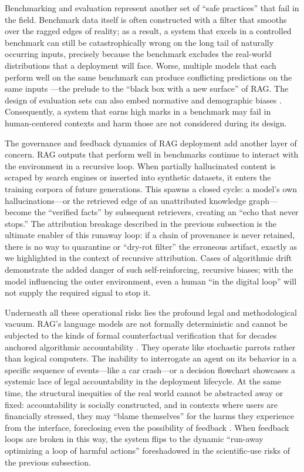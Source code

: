 \documentclass[11pt]{article}
\begin{document}
Benchmarking and evaluation represent another set of ``safe practices'' that fail in the field. Benchmark data itself is often constructed with a filter that smooths over the ragged edges of reality; as a result, a system that excels in a controlled benchmark can still be catastrophically wrong on the long tail of naturally occurring inputs, precisely because the benchmark excludes the real-world distributions that a deployment will face. Worse, multiple models that each perform well on the same benchmark can produce conflicting predictions on the same inputs \cite{ref265}---the prelude to the ``black box with a new surface'' of RAG. The design of evaluation sets can also embed normative and demographic biases \cite{ref266}. Consequently, a system that earns high marks in a benchmark may fail in human-centered contexts and harm those are not considered during its design.

The governance and feedback dynamics of RAG deployment add another layer of concern. RAG outputs that perform well in benchmarks continue to interact with the environment in a recursive loop. When partially hallucinated content is scraped by search engines or inserted into synthetic datasets, it enters the training corpora of future generations. This spawns a closed cycle: a model's own hallucinations---or the retrieved edge of an unattributed knowledge graph---become the ``verified facts'' by subsequent retrievers, creating an ``echo that never stops.'' The attribution breakage described in the previous subsection is the ultimate enabler of this runaway loop: if a chain of provenance is never retained, there is no way to quarantine or ``dry-rot filter'' the erroneous artifact, exactly as we highlighted in the context of recursive attribution. Cases of algorithmic drift demonstrate the added danger of such self-reinforcing, recursive biases; with the model influencing the outer environment, even a human ``in the digital loop'' will not supply the required signal to stop it.

Underneath all these operational risks lies the profound legal and methodological vacuum. RAG's language models are not formally deterministic and cannot be subjected to the kinds of formal counterfactual verification that for decades anchored algorithmic accountability \cite{ref267}. They operate like stochastic parrots rather than logical computers. The inability to interrogate an agent on its behavior in a specific sequence of events---like a car crash---or a decision flowchart showcases a systemic lace of legal accountability in the deployment lifecycle. At the same time, the structural inequities of the real world cannot be abstracted away or fixed: accountability is socially constructed, and in contexts where users are financially stressed, they may ``blame themselves'' for the harms they experience from the interface, foreclosing even the possibility of feedback \cite{ref268}. When feedback loops are broken in this way, the system flips to the dynamic ``run-away optimizing a loop of harmful actions'' foreshadowed in the scientific-use risks of the previous subsection.
\end{document}
